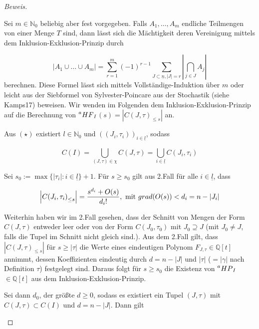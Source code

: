 \documentclass{article}
\newcommand*{\indx}[2]{{#1}_{#2}}
\newcommand*{\N}{\mathbb{N}_0}
\newcommand*{\hf}[1]{$\prescript{a}{}{HF}_{#1}$}
\newcommand*{\hp}[1]{$\prescript{a}{}{HP}_{#1}$}
\begin{document}
\begin{proof}[Beweis]
\begin{compactenum}
\item Sei $m\in\N$ beliebig aber fest vorgegeben. Falls $\indx{A}{1},\ldots,\indx{A}{m}$ endliche Teilmengen von einer Menge $T$ sind, dann lässt sich die Mächtigkeit deren Vereinigung mittels dem Inklusion-Exklusion-Prinzip durch

\begin{displaymath}
\left|\indx{A}{1}\cup\ldots\cup\indx{A}{m}\right|=\sum\limits_{r=1}^{m}(-1)^{r-1}\sum\limits_{J\subset\underline{n},\left|J\right|=r}{|\bigcap\limits_{j\in J}\indx{A}{j}|}
\end{displaymath}
berechnen. Diese Formel lässt sich mittels Vollständige-Induktion über $m$ oder leicht aus der Siebformel von Sylvester-Poincare aus der Stochastik (siehe \refname{Kamps17}) beweisen. Wir wenden im Folgenden dem Inklusion-Exklusion-Prinzip auf die Berechnung von \hf{I}$(s)=\left|\indx{C(J,\tau)}{\leq s}\right|$ an.

Aus $(\star)$ existiert $l\in\N$ und $\indx{\left((\indx{J}{i},\indx{\tau}{i})\right)}{i\in\underline{l}}$, sodass

\begin{displaymath}
C(I)=\bigcup\limits_{(J,\tau)\in \chi}C(J,\tau)=\bigcup\limits_{i\in\underline{l}}C(\indx{J}{i},\indx{\tau}{i})
\end{displaymath}

Sei $\indx{s}{0}:=\max{\{|\indx{\tau}{i}|:i\in\underline{l}\}}+1$. Für $s\geq \indx{s}{0}$ gilt  aus 2.Fall für alle $i\in \underline{l}$, dass

\begin{displaymath}
\left|\indx{C(\indx{J}{i},\indx{\tau}{i})}{\leq s}\right|=\frac{s^{\indx{d}{i}}+O(s)}{\indx{d}{i}!}, \textnormal{ mit }grad(O(s))<{\indx{d}{i}}=n-|\indx{J}{i}|
\end{displaymath}

Weiterhin haben wir im 2.Fall gesehen, dass der Schnitt von Mengen der Form $C(J,\tau)$ entweder leer oder von der Form $C(\indx{J}{0},\indx{\tau}{0})$ mit $\indx{J}{0}\supseteq J$ (mit $\indx{J}{0}\neq J$, falls die Tupel im Schnitt nicht gleich sind.). Aus dem 2.Fall gilt, dass $\left|\indx{C(J,\tau)}{\leq s}\right|$ für $s\geq |\tau|$ die Werte eines eindeutigen Polynom $\indx{F}{J,\tau}\in \mathbb{Q}[t]$ annimmt, dessen Koeffizienten eindeutig durch $d=n-|J|$ und $|\tau|$ ($=|\gamma| $ nach Definition $\tau$) festgelegt sind. Daraus folgt für $s\geq\indx{s}{0}$ die Existenz von \hp{I} $\in \mathbb{Q}[t]$ aus dem Inklusion-Exklusion-Prinzip.


Sei dann $\indx{d}{0}$, der größte $d\geq0$, sodass es existiert ein Tupel $(J,\tau)$ mit $C(J,\tau)\subset C(I)$ und $d=n-|J|$. Dann gilt


\end{compactenum}
\end{proof}
\end{document}
